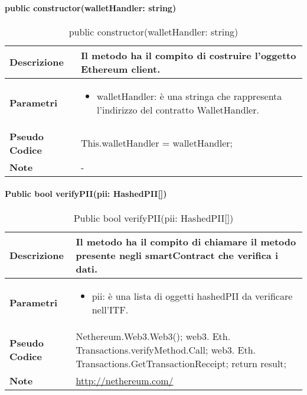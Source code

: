 \paragraph{public constructor(walletHandler: string)}
\begin{center}
    \begin{longtable}{|p{3cm}|p{9cm}|}%
    \caption{public constructor(walletHandler: string)}
    \label{tab:public-nethclient-constructor}
    \endfirsthead
    \endhead
    \hline
    \textbf{Descrizione} & Il metodo ha il compito di costruire l’oggetto Ethereum client.\\
    \hline
    \textbf{Parametri} &      
    \begin{itemize}
        \item walletHandler: è una stringa che rappresenta l’indirizzo del contratto WalletHandler.
    \end{itemize} 
    \\
    \hline
    \textbf{Pseudo Codice} & 
    This.walletHandler = walletHandler;\\
    \hline
    \textbf{Note} & - \\
    \hline
    \end{longtable}
    \end{center}


\paragraph{Public bool verifyPII(pii: HashedPII[])}
\begin{center}
    \begin{longtable}{|p{3cm}|p{9cm}|}%
    \caption{Public bool verifyPII(pii: HashedPII[])}
    \label{tab:public-bool-verifyPIIImpl}
    \endfirsthead
    \endhead
    \hline
    \textbf{Descrizione} & Il metodo ha il compito di chiamare il metodo presente negli smartContract che verifica i dati.\\
    \hline
    \textbf{Parametri} &      
    \begin{itemize}
        \item pii: è una lista di oggetti hashedPII da verificare nell’ITF.
    \end{itemize} 
    \\
    \hline
    \textbf{Pseudo Codice} & 
    Nethereum.Web3.Web3();\newline
    web3. Eth. Transactions.verifyMethod.Call;\newline
    web3. Eth. Transactions.GetTransactionReceipt;\newline
    return result;\newline
    \\
    \hline
    \textbf{Note} & \url{http://nethereum.com/} \\
    \hline
    \end{longtable}
    \end{center}

